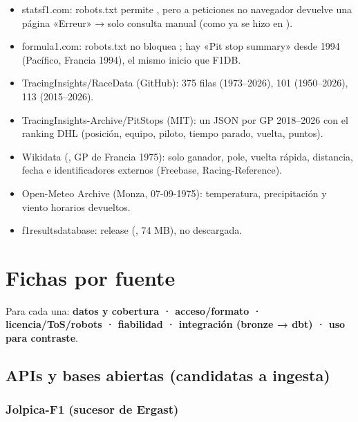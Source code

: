 \begin{itemize}
\item statsf1.com: robots.txt permite \code{*}, pero a peticiones no navegador devuelve una página «Erreur» → solo consulta manual (como ya se hizo en ).
\item formula1.com: robots.txt no bloquea ; hay «Pit stop summary» desde 1994 (Pacífico, Francia 1994), el mismo inicio que F1DB.
\item TracingInsights/RaceData (GitHub):  375 filas (1973–2026),  101 (1950–2026),  113 (2015–2026).
\item TracingInsights-Archive/PitStops (MIT): un JSON por GP 2018–2026 con el ranking DHL (posición, equipo, piloto, tiempo parado, vuelta, puntos).
\item Wikidata (, GP de Francia 1975): solo ganador, pole, vuelta rápida, distancia, fecha e identificadores externos (Freebase, Racing-Reference).
\item Open-Meteo Archive (Monza, 07-09-1975): temperatura, precipitación y viento horarios devueltos.
\item f1resultsdatabase: release  (, 74 MB), no descargada.
\end{itemize}

\section{Fichas por fuente}

Para cada una: \textbf{datos y cobertura · acceso/formato · licencia/ToS/robots · fiabilidad · integración (bronze → dbt) · uso para contraste}.

\subsection{APIs y bases abiertas (candidatas a ingesta)}

\subsubsection{Jolpica-F1 (sucesor de Ergast)}

